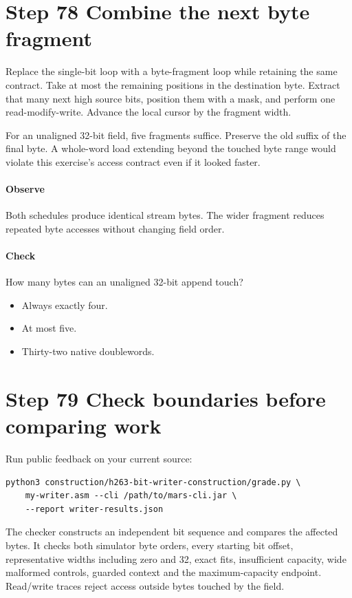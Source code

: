 \section{Step 78 Combine the next byte fragment}\label{h263-writer-s08}
Replace the single-bit loop with a byte-fragment loop while retaining the same
contract. Take at most the remaining positions in the destination byte. Extract
that many next high source bits, position them with a mask, and perform one
read-modify-write. Advance the local cursor by the fragment width.

For an unaligned 32-bit field, five fragments suffice. Preserve the old suffix
of the final byte. A whole-word load extending beyond the touched byte range
would violate this exercise's access contract even if it looked faster.

\paragraph{Observe} Both schedules produce identical stream bytes. The wider
fragment reduces repeated byte accesses without changing field order.
\paragraph{Check} How many bytes can an unaligned 32-bit append touch?
\begin{itemize}
  \item[A.] Always exactly four.
  \item[B.] At most five.
  \item[C.] Thirty-two native doublewords.
\end{itemize}

\section{Step 79 Check boundaries before comparing work}\label{h263-writer-s09}
Run public feedback on your current source:
\begin{verbatim}
python3 construction/h263-bit-writer-construction/grade.py \
    my-writer.asm --cli /path/to/mars-cli.jar \
    --report writer-results.json
\end{verbatim}
The checker constructs an independent bit sequence and compares the affected
bytes. It checks both simulator byte orders, every starting bit offset, representative
widths including zero and 32, exact fits, insufficient capacity, wide malformed
controls, guarded context and the maximum-capacity endpoint. Read/write traces
reject access outside bytes touched by the field.

